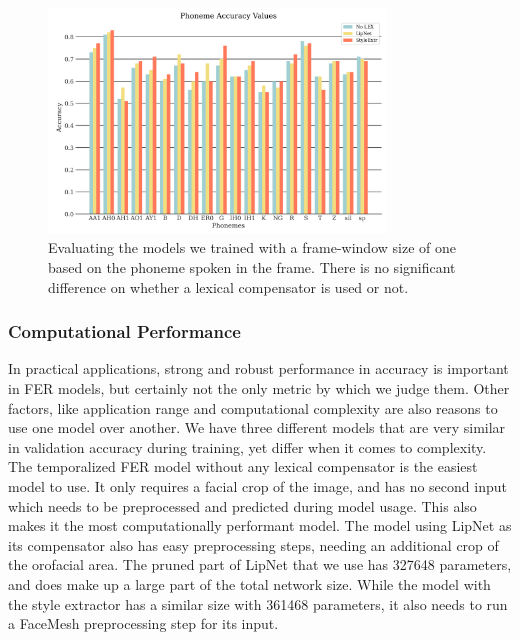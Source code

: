 \begin{figure}
    \centering
    \includegraphics[width=0.8\textwidth]{res/ModelsOnPhones.png}
    \caption{Evaluating the models we trained with a frame-window size of one based on the phoneme spoken in the frame. There is no significant difference on whether a lexical compensator is used or not.}
    \label{fig:modelsonphones}
\end{figure}

\subsubsection{Computational Performance}
\label{sub:computational}
In practical applications, strong and robust performance in accuracy is important in FER models, but certainly not the only metric by which we judge them. Other factors, like application range and computational complexity are also reasons to use one model over another. We have three different models that are very similar in validation accuracy during training, yet differ when it comes to complexity. The temporalized FER model without any lexical compensator is the easiest model to use. It only requires a facial crop of the image, and has no second input which needs to be preprocessed and predicted during model usage. This also makes it the most computationally performant model. The model using LipNet as its compensator also has easy preprocessing steps, needing an additional crop of the orofacial area. The pruned part of LipNet that we use has 327648 parameters, and does make up a large part of the total network size. While the model with the style extractor has a similar size with 361468 parameters, it also needs to run a FaceMesh preprocessing step for its input.

